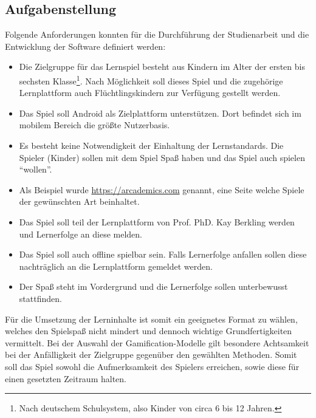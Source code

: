 \subsection{Aufgabenstellung}
	Folgende Anforderungen konnten für die Durchführung der Studienarbeit und die Entwicklung der Software definiert werden:
	\begin{itemize}
		\item{ Die Zielgruppe für das Lernspiel besteht aus Kindern im Alter der ersten bis sechsten Klasse\footnote{Nach deutschem Schulsystem, also Kinder von circa 6 bis 12 Jahren.}. Nach Möglichkeit soll dieses Spiel und die zugehörige Lernplattform auch Flüchtlingskindern zur Verfügung gestellt werden. }
		\item{ Das Spiel soll Android als Zielplattform unterstützen. Dort befindet sich im mobilem Bereich die größte Nutzerbasis. }
		\item{ Es besteht keine Notwendigkeit der Einhaltung der Lernstandards. Die Spieler (Kinder) sollen mit dem Spiel Spaß haben und das Spiel auch spielen \enquote{wollen}. }
		\item{ Als Beispiel wurde \url{https://arcademics.com} genannt, eine Seite welche Spiele der gewünschten Art beinhaltet. }
		\item{ Das Spiel soll teil der Lernplattform von Prof. PhD. Kay Berkling werden und Lernerfolge an diese melden. }
		\item{ Das Spiel soll auch offline spielbar sein. Falls Lernerfolge anfallen sollen diese nachträglich an die Lernplattform gemeldet werden. }
		\item{ Der Spaß steht im Vordergrund und die Lernerfolge sollen unterbewusst stattfinden. }
	\end{itemize}
	Für die Umsetzung der Lerninhalte ist somit ein geeignetes Format zu wählen, welches den Spielspaß nicht mindert und dennoch wichtige Grundfertigkeiten vermittelt.
	Bei der Auswahl der Gamification-Modelle gilt besondere Achtsamkeit bei der Anfälligkeit der Zielgruppe gegenüber den gewählten Methoden. Somit soll das Spiel sowohl die Aufmerksamkeit des Spielers erreichen, sowie diese für einen gesetzten Zeitraum halten.

